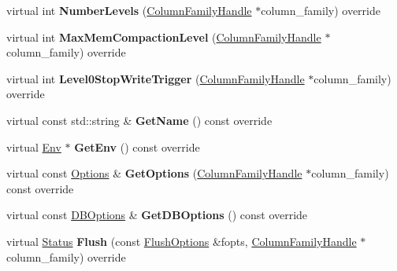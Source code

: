 \begin{DoxyCompactItemize}
\item 
virtual int {\bfseries Number\+Levels} (\hyperlink{classrocksdb_1_1ColumnFamilyHandle}{Column\+Family\+Handle} $\ast$column\+\_\+family) override\hypertarget{classrocksdb_1_1StackableDB_a6c7e5838a1a8121ced058c8fd52e5755}{}\label{classrocksdb_1_1StackableDB_a6c7e5838a1a8121ced058c8fd52e5755}

\item 
virtual int {\bfseries Max\+Mem\+Compaction\+Level} (\hyperlink{classrocksdb_1_1ColumnFamilyHandle}{Column\+Family\+Handle} $\ast$column\+\_\+family) override\hypertarget{classrocksdb_1_1StackableDB_a29c31a0c69ca4bb2c9405e78abd3f220}{}\label{classrocksdb_1_1StackableDB_a29c31a0c69ca4bb2c9405e78abd3f220}

\item 
virtual int {\bfseries Level0\+Stop\+Write\+Trigger} (\hyperlink{classrocksdb_1_1ColumnFamilyHandle}{Column\+Family\+Handle} $\ast$column\+\_\+family) override\hypertarget{classrocksdb_1_1StackableDB_ab6db35f8b920c927a1ab5be9ebe7654f}{}\label{classrocksdb_1_1StackableDB_ab6db35f8b920c927a1ab5be9ebe7654f}

\item 
virtual const std\+::string \& {\bfseries Get\+Name} () const override\hypertarget{classrocksdb_1_1StackableDB_a35e1c048ece03e68cbc4e4cecb4298c4}{}\label{classrocksdb_1_1StackableDB_a35e1c048ece03e68cbc4e4cecb4298c4}

\item 
virtual \hyperlink{classrocksdb_1_1Env}{Env} $\ast$ {\bfseries Get\+Env} () const override\hypertarget{classrocksdb_1_1StackableDB_a4335d4beb5909fcbc90df7c004068a8c}{}\label{classrocksdb_1_1StackableDB_a4335d4beb5909fcbc90df7c004068a8c}

\item 
virtual const \hyperlink{structrocksdb_1_1Options}{Options} \& {\bfseries Get\+Options} (\hyperlink{classrocksdb_1_1ColumnFamilyHandle}{Column\+Family\+Handle} $\ast$column\+\_\+family) const override\hypertarget{classrocksdb_1_1StackableDB_a8d254a9b94dcd86e0d288256ba5444b3}{}\label{classrocksdb_1_1StackableDB_a8d254a9b94dcd86e0d288256ba5444b3}

\item 
virtual const \hyperlink{structrocksdb_1_1DBOptions}{D\+B\+Options} \& {\bfseries Get\+D\+B\+Options} () const override\hypertarget{classrocksdb_1_1StackableDB_a6eda7f27652078d46636dd3c9f8be902}{}\label{classrocksdb_1_1StackableDB_a6eda7f27652078d46636dd3c9f8be902}

\item 
virtual \hyperlink{classrocksdb_1_1Status}{Status} {\bfseries Flush} (const \hyperlink{structrocksdb_1_1FlushOptions}{Flush\+Options} \&fopts, \hyperlink{classrocksdb_1_1ColumnFamilyHandle}{Column\+Family\+Handle} $\ast$column\+\_\+family) override\hypertarget{classrocksdb_1_1StackableDB_a299701234b6a4191ca9930d2fdd1fa88}{}\label{classrocksdb_1_1StackableDB_a299701234b6a4191ca9930d2fdd1fa88}


\end{DoxyCompactItemize}
